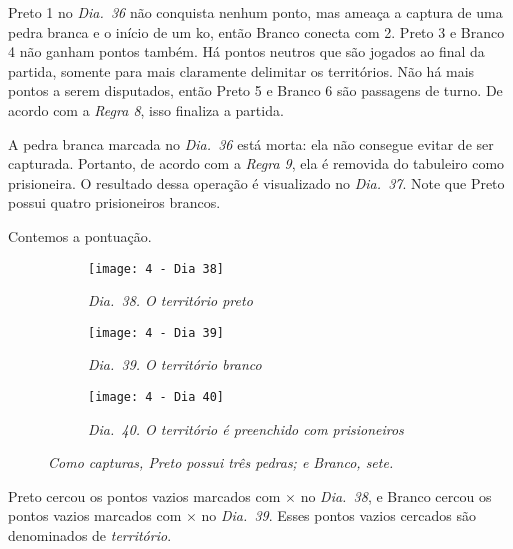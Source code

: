 Preto 1 no \emph{Dia.\@~36} não conquista nenhum ponto, mas ameaça a captura de uma pedra branca e o início de um ko, então Branco conecta com 2. Preto 3 e Branco 4 não ganham pontos também. Há pontos neutros que são jogados ao final da partida, somente para mais claramente delimitar os territórios. Não há mais pontos a serem disputados, então Preto 5 e Branco 6 são passagens de turno. De acordo com a \emph{Regra 8}, isso finaliza a partida.

A pedra branca marcada no \emph{Dia.\@~36} está morta: ela não consegue evitar de ser capturada. Portanto, de acordo com a \emph{Regra 9}, ela é removida do tabuleiro como prisioneira. O resultado dessa operação é visualizado no \emph{Dia.\@~37}. Note que Preto possui quatro prisioneiros brancos.

Contemos a pontuação.

\pagebreak

\begin{figure}[h!]
    \centering
    \begin{subfigure}[t]{.3\textwidth}
        \centering
        \texttt{[image: 4 - Dia 38]}
        \caption*{\emph{Dia.\@~38. O território preto}}
    \end{subfigure}
    \hfill
    \begin{subfigure}[t]{.3\textwidth}
        \centering
        \texttt{[image: 4 - Dia 39]}
        \caption*{\emph{Dia.\@~39. O território branco}}
    \end{subfigure}
    \hfill
    \begin{subfigure}[t]{.3\textwidth}
        \centering
        \texttt{[image: 4 - Dia 40]}
        \caption*{\emph{Dia.\@~40. O território é preenchido com prisioneiros}}
    \end{subfigure}
    \vspace*{.5cm}
    \captionsetup{justification=centering}
    \caption*{\emph{Como capturas, Preto possui três pedras; e Branco, sete.}}
\end{figure}

Preto cercou os pontos vazios marcados com $\times$ no \emph{Dia.\@~38}, e Branco cercou os pontos vazios marcados com $\times$ no \emph{Dia.\@~39}. Esses pontos vazios cercados são denominados de \emph{território}.


